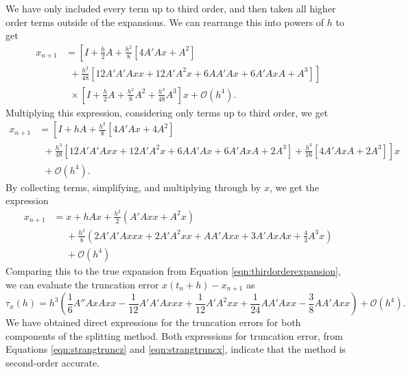 We have only included every term up to third order, and then taken all higher order terms outside of the expansions.
We can rearrange this into powers of $h$ to get
\begin{align*}
    x_{n+1} &= \left[
        I + \frac{h}{2}A + \frac{h^2}{8} \left[ 4A'Ax + A^2 \right] \right. \\
        &~~ + \left. \frac{h^3}{48}\left[ 12 A' A' A xx + 12 A' A^2 x + 6 A A' Ax + 6 A' AxA + A^3 \right] \right] \\
        &~~ \times \left[
        I + \frac{h}{2}A + \frac{h^2}{8}A^2 + \frac{h^3}{48}A^3
    \right]x + \mathcal{O}(h^4).
\end{align*}
Multiplying this expression, considering only terms up to third order, we get
\begin{align*}
    x_{n+1} &= \left[
        I + hA + \frac{h^2}{8} \left[ 4 A' Ax + 4A^2 \right]
    \right. \\
    &~~ + \left.
        \frac{h^3}{48} \left[ 12 A' A' A xx + 12 A' A^2 x + 6 A A' Ax + 6 A' Ax A + 2A^3  \right] + \frac{h^3}{16} \left[ 4 A' AxA + 2A^3 \right]
    \right]x \\
    &~~ + \mathcal{O}(h^4). 
\end{align*}
By collecting terms, simplifying, and multiplying through by $x$, we get the expression
\begin{equation}
    \begin{aligned}
        x_{n+1} &= x + h Ax + \frac{h^2}{2} \left( A' A xx + A^2 x \right) \\
        &~~~~~~ + \frac{h^3}{8} \left(
            2A'A'Axxx + 2 A' A^2 xx + A A' A xx + 3 A' Ax Ax + \frac{4}{3}A^3 x
            \right) \\
        &~~~~~~ + \mathcal{O}(h^4)
    \end{aligned}
    \label{eqn:strangxpanda}
\end{equation}
Comparing this to the true expansion from Equation \ref{eqn:thirdorderexpansion}, we can evaluate the truncation error $x(t_n + h) - x_{n+1}$ as
\begin{equation}
    \tau_x(h) = h^3 \left(
        \frac{1}{6}A'' Ax Ax x - \frac{1}{12}A' A' A xxx + \frac{1}{12} A' A^2 xx + \frac{1}{24}A A' A xx - \frac{3}{8}A A' A xx
    \right) + \mathcal{O}(h^4).
    \label{eqn:strangtruncx}
\end{equation}
We have obtained direct expressions for the truncation errors for both components of the splitting method.
Both expressions for truncation error, from Equations \ref{eqn:strangtruncz} and \ref{eqn:strangtruncx}, indicate that the method is second-order accurate.


